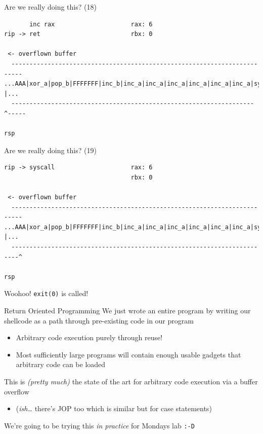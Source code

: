 \documentclass[9pt,aspectratio=169]{beamer}
\begin{document}
\begin{frame}[label={sec:org7ac66e1},fragile]{Are we really doing this? (18)}
 \begin{verbatim}
       inc rax                     rax: 6
rip -> ret                         rbx: 0

 <- overflown buffer 
  -------------------------------------------------------------------------
...AAA|xor_a|pop_b|FFFFFFF|inc_b|inc_a|inc_a|inc_a|inc_a|inc_a|inc_a|sys |...
  -------------------------------------------------------------------^-----
                                                                     rsp
\end{verbatim}
\end{frame}
\begin{frame}[label={sec:orgff64283},fragile]{Are we really doing this? (19)}
 \begin{verbatim}
rip -> syscall                     rax: 6
                                   rbx: 0

 <- overflown buffer 
  -------------------------------------------------------------------------
...AAA|xor_a|pop_b|FFFFFFF|inc_b|inc_a|inc_a|inc_a|inc_a|inc_a|inc_a|sys |...
  ------------------------------------------------------------------------^
                                                                          rsp
\end{verbatim}

Woohoo! \texttt{exit(0)} is called!
\end{frame}

\begin{frame}[label={sec:org2b845d0},fragile]{Return Oriented Programming}
 We just wrote an entire program by writing our shellcode as a path through pre-existing code in our program
\begin{itemize}
\item Arbitrary code execution purely through reuse!
\item Most sufficiently large programs will contain enough usable gadgets that arbitrary code can be loaded
\end{itemize}

This is \emph{(pretty much)} the state of the art for arbitrary code execution via a buffer overflow
\begin{itemize}
\item (\emph{ish\ldots{}} there's JOP too which is similar but for case statements)
\end{itemize}

We're going to be trying this \emph{in practice} for Mondays lab \texttt{:-D}
\end{frame}
\end{document}
